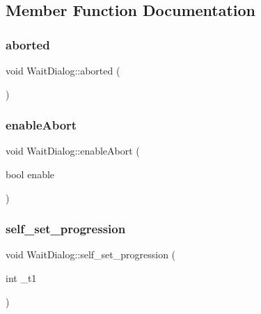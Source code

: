 \subsection{Member Function Documentation}
\mbox{\label{class_wait_dialog_ab10b3b29a26766060425e76bdd5f983c}} 
\subsubsection{\texorpdfstring{aborted}{aborted}}
{\footnotesize\ttfamily void Wait\+Dialog\+::aborted (\begin{DoxyParamCaption}{ }\end{DoxyParamCaption})\hspace{0.3cm}{\ttfamily [signal]}}

\mbox{\label{class_wait_dialog_ab7ea862a3fc19b1cc3586f7bf3fb67ef}} 
\subsubsection{\texorpdfstring{enableAbort}{enableAbort}}
{\footnotesize\ttfamily void Wait\+Dialog\+::enable\+Abort (\begin{DoxyParamCaption}\item[{bool}]{enable }\end{DoxyParamCaption})\hspace{0.3cm}{\ttfamily [slot]}}

\mbox{\label{class_wait_dialog_a7af3286633d36f4c1e84b64dbcdd24f4}} 
\subsubsection{\texorpdfstring{self\_set\_progression}{self\_set\_progression}}
{\footnotesize\ttfamily void Wait\+Dialog\+::self\+\_\+set\+\_\+progression (\begin{DoxyParamCaption}\item[{int}]{\+\_\+t1 }\end{DoxyParamCaption})\hspace{0.3cm}{\ttfamily [signal]}}

